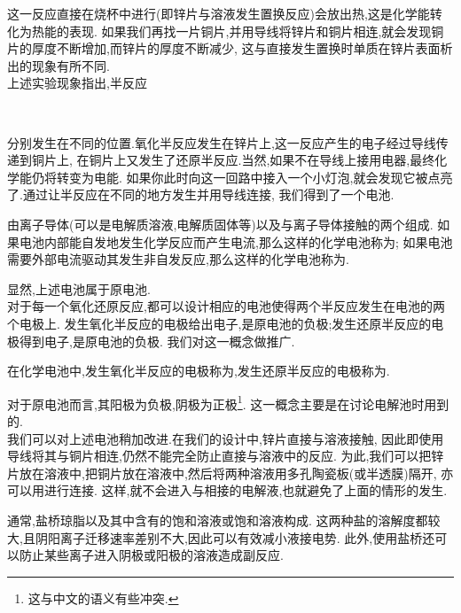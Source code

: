 \documentclass{ctexart}
\begin{document}
这一反应直接在烧杯中进行(即锌片与溶液发生置换反应)会放出热,这是化学能转化为热能的表现.%
如果我们再找一片铜片,并用导线将锌片和铜片相连,就会发现铜片的厚度不断增加,而锌片的厚度不断减少,%
这与直接发生置换时单质在锌片表面析出的现象有所不同.\\
\indent 上述实验现象指出,半反应
\begin{tightcenter}
    \\
\end{tightcenter}
分别发生在不同的位置.氧化半反应发生在锌片上,这一反应产生的电子经过导线传递到铜片上,%
在铜片上又发生了还原半反应.当然,如果不在导线上接用电器,最终化学能仍将转变为电能.%
如果你此时向这一回路中接入一个小灯泡,就会发现它被点亮了.通过让半反应在不同的地方发生并用导线连接,%
我们得到了一个电池.
\begin{definition}[6B.2.1 化学电池]
    由离子导体(可以是电解质溶液,电解质固体等)以及与离子导体接触的两个组成.%
    如果电池内部能自发地发生化学反应而产生电流,那么这样的化学电池称为;%
    如果电池需要外部电流驱动其发生非自发反应,那么这样的化学电池称为.
\end{definition}
显然,上述电池属于原电池.\\
\indent 对于每一个氧化还原反应,都可以设计相应的电池使得两个半反应发生在电池的两个电极上.%
发生氧化半反应的电极给出电子,是原电池的负极;发生还原半反应的电极得到电子,是原电池的负极.%
我们对这一概念做推广.
\begin{definition}[6B.2.2 阳极与阴极]
    在化学电池中,发生氧化半反应的电极称为,发生还原半反应的电极称为.
\end{definition}
对于原电池而言,其阳极为负极,阴极为正极\footnote{这与中文的语义有些冲突.}.%
这一概念主要是在讨论电解池时用到的.\\
\indent 我们可以对上述电池稍加改进.在我们的设计中,锌片直接与溶液接触,%
因此即使用导线将其与铜片相连,仍然不能完全防止直接与溶液中的反应.%
为此,我们可以把锌片放在溶液中,把铜片放在溶液中,然后将两种溶液用多孔陶瓷板(或半透膜)隔开,%
亦可以用进行连接.%
这样,就不会进入与相接的电解液,也就避免了上面的情形的发生.
\begin{hint}
    通常,盐桥琼脂以及其中含有的饱和溶液或饱和溶液构成.%
    这两种盐的溶解度都较大,且阴阳离子迁移速率差别不大,因此可以有效减小液接电势\footnotemark.%
    此外,使用盐桥还可以防止某些离子进入阴极或阳极的溶液造成副反应.
\end{hint}
\end{document}
